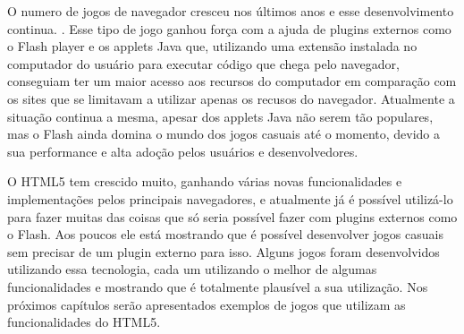 O numero de jogos de navegador cresceu nos últimos anos e esse
desenvolvimento continua. \cite{ozcan2010recent}. Esse tipo de jogo
ganhou força com a ajuda de plugins externos como o Flash player e
os applets Java que, utilizando uma extensão instalada no computador
do usuário para executar código que chega pelo navegador,
conseguiam ter um maior acesso aos recursos do
computador em comparação com os sites que se limitavam a utilizar
apenas os recusos do navegador.
Atualmente a situação continua a mesma, apesar dos applets Java não
serem tão populares, mas o Flash ainda domina o mundo dos jogos
casuais até o momento, devido a sua performance e alta adoção pelos
usuários e desenvolvedores.

O HTML5 tem crescido muito, ganhando várias novas funcionalidades e
implementações pelos principais navegadores, e atualmente já é possível utilizá-lo
para fazer muitas das coisas que só seria possível fazer com plugins
externos como o Flash. Aos poucos ele está mostrando que é possível
desenvolver jogos casuais sem precisar de um plugin externo para isso.
Alguns jogos foram desenvolvidos utilizando essa tecnologia, cada um
utilizando o melhor de algumas funcionalidades e mostrando que é
totalmente plausível a sua utilização. Nos próximos capítulos serão
apresentados exemplos de jogos que utilizam as funcionalidades do HTML5.
